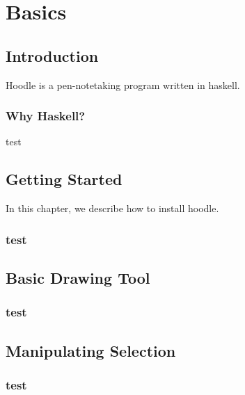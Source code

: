 \documentclass[11pt,fleqn]{book} %
\begin{document}

\pagebreak
{}
\setcounter{page}{1}

\part{Basics}




\chapter{Introduction}

Hoodle is a pen-notetaking program written in haskell.

\section{Why Haskell?}
test
\lipsum[1-30]

\chapter{Getting Started}

In this chapter, we describe how to install hoodle. 

\lipsum[1-14]

\section{test}


\chapter{Basic Drawing Tool} 


\section{test}

\chapter{Manipulating Selection}%

\section{test}
\end{document}
